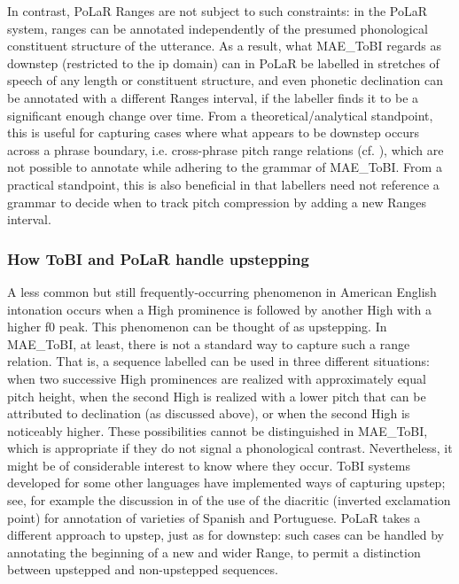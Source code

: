 \documentclass[11pt, twoside]{memoir}
\def\textlabel#1{{\relsize{-.5}\fontspec[Mapping=tex-text]{Roboto Mono}{#1}}}
\begin{document}
In contrast, PoLaR Ranges are not subject to such constraints: in the PoLaR system, ranges can be annotated independently of the presumed phonological constituent structure of the utterance. As a result, what MAE\_ToBI regards as downstep (restricted to the ip domain) can in PoLaR be labelled in stretches of speech of any length or constituent structure, and even phonetic declination can be annotated with a different Ranges interval, if the labeller finds it to be a significant enough change over time. From a theoretical\slash analytical standpoint, this is useful for capturing cases where what appears to be downstep occurs across a phrase boundary, i.e. cross-phrase pitch range relations (cf. \citealt{ladd88, brugos15}), which are not possible to annotate while adhering to the grammar of MAE\_ToBI. From a practical standpoint, this is also beneficial in that labellers need not reference a grammar to decide when to track pitch compression by adding a new Ranges interval.

\subsubsection{How ToBI and PoLaR handle upstepping}\label{sec:upstepping}
A less common but still frequently-occurring phenomenon in American English intonation occurs when a High prominence is followed by another High with a higher f0 peak.  This phenomenon can be thought of as upstepping. In MAE\_ToBI, at least, there is not a standard way to capture such a range relation.  That is, a sequence labelled \textlabel{H* H*} can be used in three different situations: when two successive High prominences are realized with approximately equal pitch height, when the second High is realized with a lower pitch that can be attributed to declination (as discussed above), or when the second High is noticeably higher. These possibilities cannot be distinguished in MAE\_ToBI, which is appropriate if they do not signal a phonological contrast. Nevertheless, it might be of considerable interest to know where they occur. ToBI systems developed for some other languages have implemented ways of capturing upstep; see, for example the discussion in \citet{armstrong-14} of the use of the \textlabel{¡} diacritic (inverted exclamation point) for annotation of varieties of Spanish and Portuguese. PoLaR takes a different approach to upstep, just as for downstep: such cases can be handled by annotating the beginning of a new and wider Range, to permit a distinction between upstepped and non-upstepped sequences.
\end{document}
